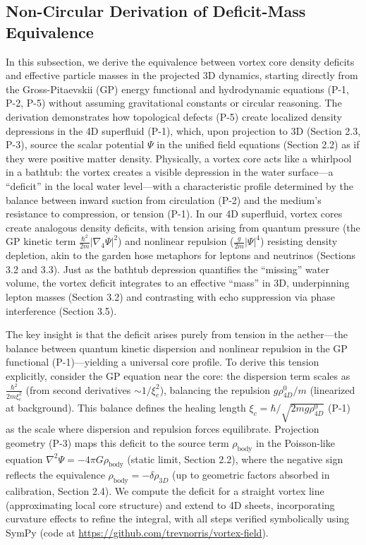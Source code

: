 \subsection{Non-Circular Derivation of Deficit-Mass Equivalence}

In this subsection, we derive the equivalence between vortex core density deficits and effective particle masses in the projected 3D dynamics, starting directly from the Gross-Pitaevskii (GP) energy functional and hydrodynamic equations (P-1, P-2, P-5) without assuming gravitational constants or circular reasoning. The derivation demonstrates how topological defects (P-5) create localized density depressions in the 4D superfluid (P-1), which, upon projection to 3D (Section 2.3, P-3), source the scalar potential $\Psi$ in the unified field equations (Section 2.2) as if they were positive matter density. Physically, a vortex core acts like a whirlpool in a bathtub: the vortex creates a visible depression in the water surface---a ``deficit'' in the local water level---with a characteristic profile determined by the balance between inward suction from circulation (P-2) and the medium's resistance to compression, or tension (P-1). In our 4D superfluid, vortex cores create analogous density deficits, with tension arising from quantum pressure (the GP kinetic term $\frac{\hbar^2}{2m} |\nabla_4 \Psi|^2$) and nonlinear repulsion ($\frac{g}{2m} |\Psi|^4$) resisting density depletion, akin to the garden hose metaphors for leptons and neutrinos (Sections 3.2 and 3.3). Just as the bathtub depression quantifies the ``missing'' water volume, the vortex deficit integrates to an effective ``mass'' in 3D, underpinning lepton masses (Section 3.2) and contrasting with echo suppression via phase interference (Section 3.5).

The key insight is that the deficit arises purely from tension in the aether---the balance between quantum kinetic dispersion and nonlinear repulsion in the GP functional (P-1)---yielding a universal core profile. To derive this tension explicitly, consider the GP equation near the core: the dispersion term scales as $\frac{\hbar^2}{2 m \xi_c^2}$ (from second derivatives $\sim 1/\xi_c^2$), balancing the repulsion $g \rho_{4D}^0 / m$ (linearized at background). This balance defines the healing length $\xi_c = \hbar / \sqrt{2 m g \rho_{4D}^0}$ (P-1) as the scale where dispersion and repulsion forces equilibrate. Projection geometry (P-3) maps this deficit to the source term $\rho_{\text{body}}$ in the Poisson-like equation $\nabla^2 \Psi = -4\pi G \rho_{\text{body}}$ (static limit, Section 2.2), where the negative sign reflects the equivalence $\rho_{\text{body}} = - \delta \rho_{3D}$ (up to geometric factors absorbed in calibration, Section 2.4). We compute the deficit for a straight vortex line (approximating local core structure) and extend to 4D sheets, incorporating curvature effects to refine the integral, with all steps verified symbolically using SymPy (code at \url{https://github.com/trevnorris/vortex-field}).

